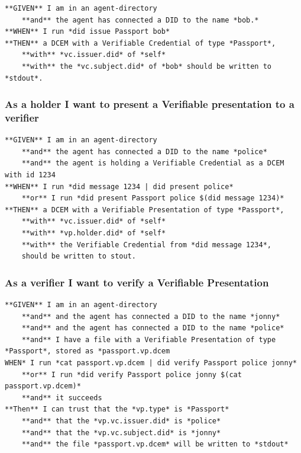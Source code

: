 \begin{lstlisting}
**GIVEN** I am in an agent-directory
    **and** the agent has connected a DID to the name *bob.*
**WHEN** I run *did issue Passport bob*
**THEN** a DCEM with a Verifiable Credential of type *Passport*, 
    **with** *vc.issuer.did* of *self*
    **with** the *vc.subject.did* of *bob* should be written to *stdout*.
\end{lstlisting}

\hypertarget{as-a-holder-i-want-to-present-a-verifiable-presentation-to-a-verifier}{%
\subsubsection{As a holder I want to present a Verifiable presentation
to a
verifier}\label{as-a-holder-i-want-to-present-a-verifiable-presentation-to-a-verifier}}

\begin{lstlisting}
**GIVEN** I am in an agent-directory
    **and** the agent has connected a DID to the name *police*
    **and** the agent is holding a Verifiable Credential as a DCEM with id 1234
**WHEN** I run *did message 1234 | did present police*
    **or** I run *did present Passport police $(did message 1234)*
**THEN** a DCEM with a Verifiable Presentation of type *Passport*, 
    **with** *vc.issuer.did* of *self*
    **with** *vp.holder.did* of *self*
    **with** the Verifiable Credential from *did message 1234*, 
    should be written to stout.
\end{lstlisting}

\hypertarget{as-a-verifier-i-want-to-verify-a-verifiable-presentation}{%
\subsubsection{As a verifier I want to verify a Verifiable
Presentation}\label{as-a-verifier-i-want-to-verify-a-verifiable-presentation}}

\begin{lstlisting}
**GIVEN** I am in an agent-directory
    **and** and the agent has connected a DID to the name *jonny*
    **and** and the agent has connected a DID to the name *police*
    **and** I have a file with a Verifiable Presentation of type *Passport*, stored as *passport.vp.dcem
WHEN* I run *cat passport.vp.dcem | did verify Passport police jonny*
    **or** I run *did verify Passport police jonny $(cat passport.vp.dcem)*
    **and** it succeeds
**Then** I can trust that the *vp.type* is *Passport*
    **and** that the *vp.vc.issuer.did* is *police*
    **and** that the *vp.vc.subject.did* is *jonny*
    **and** the file *passport.vp.dcem* will be written to *stdout*
\end{lstlisting}

